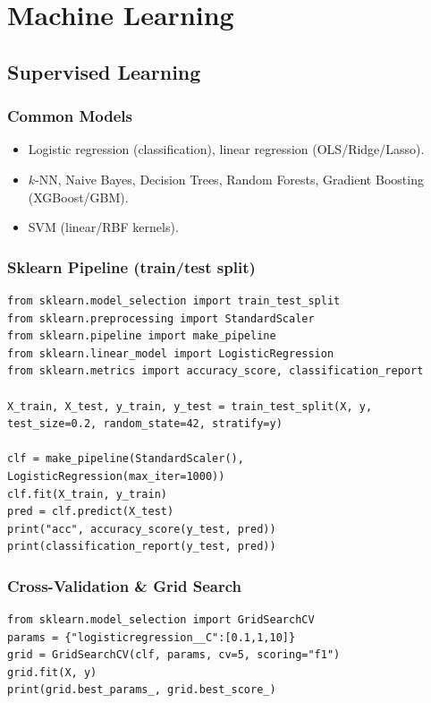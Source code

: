 \chapter{Machine Learning}

\section{Supervised Learning}
\subsection*{Common Models}
\begin{itemize}
    \item Logistic regression (classification), linear regression (OLS/Ridge/Lasso).
    \item $k$-NN, Naive Bayes, Decision Trees, Random Forests, Gradient Boosting (XGBoost/GBM).
    \item SVM (linear/RBF kernels).
\end{itemize}

\subsection*{Sklearn Pipeline (train/test split)}
\begin{lstlisting}
from sklearn.model_selection import train_test_split
from sklearn.preprocessing import StandardScaler
from sklearn.pipeline import make_pipeline
from sklearn.linear_model import LogisticRegression
from sklearn.metrics import accuracy_score, classification_report

X_train, X_test, y_train, y_test = train_test_split(X, y, test_size=0.2, random_state=42, stratify=y)

clf = make_pipeline(StandardScaler(), LogisticRegression(max_iter=1000))
clf.fit(X_train, y_train)
pred = clf.predict(X_test)
print("acc", accuracy_score(y_test, pred))
print(classification_report(y_test, pred))
\end{lstlisting}

\subsection*{Cross-Validation \& Grid Search}
\begin{lstlisting}
from sklearn.model_selection import GridSearchCV
params = {"logisticregression__C":[0.1,1,10]}
grid = GridSearchCV(clf, params, cv=5, scoring="f1")
grid.fit(X, y)
print(grid.best_params_, grid.best_score_)
\end{lstlisting}

